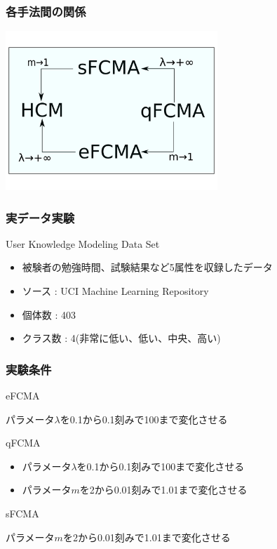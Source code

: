 \documentclass[13pt,dvipdfmx]{beamer}
\begin{document}
\begin{frame}\frametitle{各手法間の関係}
  \begin{center}
    \includegraphics[height=60mm]{method.png}
  \end{center}
\end{frame}

\begin{frame}\frametitle{実データ実験}
  \begin{block}{User Knowledge Modeling Data Set}
    \begin{itemize}
    \item 被験者の勉強時間、試験結果など5属性を収録したデータ
    \item ソース : UCI  Machine Learning Repository
    \item 個体数 : 403
    \item クラス数 : 4(非常に低い、低い、中央、高い)
    \end{itemize}
  \end{block}
\end{frame}

\begin{frame}\frametitle{実験条件}
  \begin{block}{eFCMA}
    \begin{center}
      パラメータ$\lambda$を0.1から0.1刻みで100まで変化させる
    \end{center}
  \end{block}
  \begin{block}{qFCMA}
    \begin{itemize}
      \item パラメータ$\lambda$を0.1から0.1刻みで100まで変化させる
      \item パラメータ$m$を2から0.01刻みで1.01まで変化させる
    \end{itemize}
  \end{block}
  \begin{block}{sFCMA}
    \begin{center}
      パラメータ$m$を2から0.01刻みで1.01まで変化させる
    \end{center}
  \end{block}
\end{frame}
\end{document}
